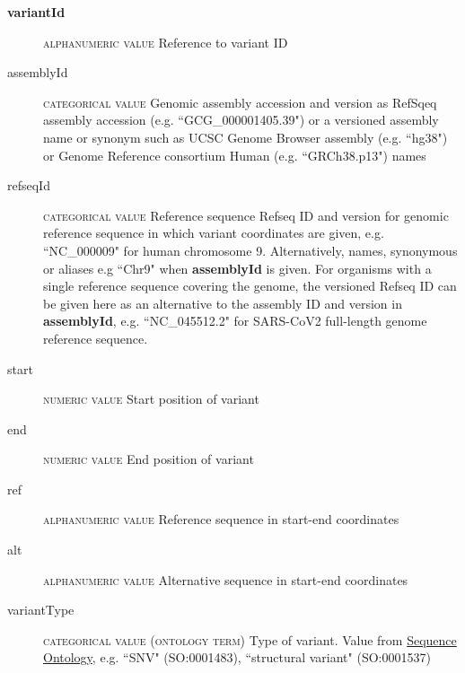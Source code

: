 \documentclass[a4paper, 10pt]{article}        %
\begin{document}
\begin{description}
	\item[\textbf{variantId}] {\textsc{alphanumeric value}} Reference to variant ID
	\item[assemblyId] {\textsc{categorical value}} Genomic assembly accession and version as RefSqeq assembly accession (e.g. ``GCG\_000001405.39") or a versioned assembly name or synonym such as UCSC Genome Browser assembly (e.g. ``hg38") or Genome Reference consortium Human (e.g. ``GRCh38.p13") names
 	\item[refseqId] {\textsc{categorical value}} Reference sequence Refseq ID and version for genomic reference sequence in which variant coordinates are given, e.g. ``NC\_000009" for human chromosome 9. Alternatively, names, synonymous or aliases e.g ``Chr9" when \textbf{assemblyId} is given. For organisms with a single reference sequence covering the genome, the versioned Refseq ID can be given here as an alternative to the assembly ID and version in \textbf{assemblyId}, e.g. ``NC\_045512.2" for SARS-CoV2 full-length genome reference sequence. 
	\item[start] {\textsc{numeric value}} Start position of variant
	\item[end] {\textsc{numeric value}} End position of variant %
	\item[ref] {\textsc{alphanumeric value}} Reference sequence in start-end coordinates
	\item[alt] {\textsc{alphanumeric value}} Alternative sequence in start-end coordinates
	\item[variantType] {\textsc{categorical value (ontology term)}} Type of variant. Value from \href{http://www.sequenceontology.org}{Sequence Ontology}, e.g. ``SNV" (SO:0001483), ``structural variant"  (SO:0001537)
 \end{description}
 
\end{document}
